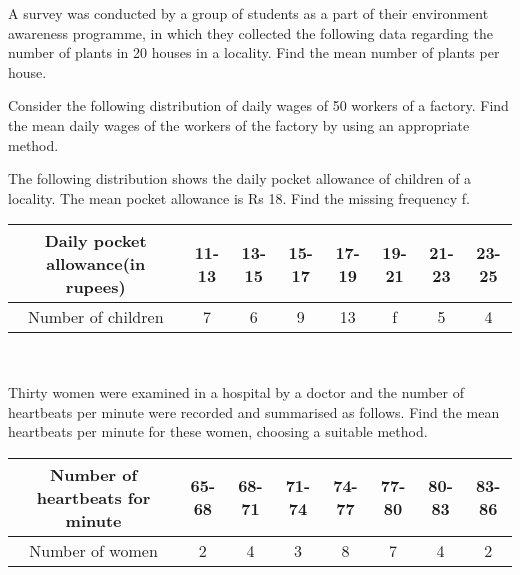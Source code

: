 \item A survey was conducted by a group of students as a part of their environment awareness
programme, in which they collected the following data regarding the number of plants in
20 houses in a locality. Find the mean number of plants per house.\\
\begin{table}[!ht]
\centering
{}
\caption{}
\label{table:2.2.1}
\end{table}
%
\item Consider the following distribution of daily wages of 50 workers of a factory.
Find the mean daily wages of the workers of the factory by using an appropriate method.
\item The following distribution shows the daily pocket allowance of children of a locality.
The mean pocket allowance is Rs 18. Find the missing frequency f.
\begin{tabular}{|c|c|c|c|c|c|c|c|}
\hline
Daily pocket allowance(in rupees) &11-13&13-15&15-17&17-19&19-21&21-23&23-25\\
\hline
Number of children&7&6&9&13&f&5&4\\
\hline
\end{tabular}\\
\item Thirty women were examined in a hospital by a doctor and the number of heartbeats per
minute were recorded and summarised as follows. Find the mean heartbeats per minute
for these women, choosing a suitable method.
\begin{tabular}{|c|c|c|c|c|c|c|c|}
\hline
Number of heartbeats for minute &65-68&68-71&71-74&74-77&77-80&80-83&83-86\\
\hline
Number of women&2&4&3&8&7&4&2\\
\hline
\end{tabular}\\
